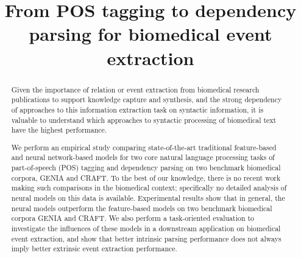 \documentclass[twocolumn,hyperref]{bmcart}\pdfoutput=1
\begin{document}
\begin{frontmatter}

\begin{fmbox}



\title{From POS tagging to dependency parsing for biomedical event extraction}



\author[
noteref={n1}, 
]{ }
\author[
noteref={n2}, 
]{ }





\begin{artnotes}
   \end{artnotes}





\begin{abstractbox}

\begin{abstract} 


 Given the importance of relation or event extraction from biomedical research publications to support knowledge capture and synthesis, and the strong dependency of approaches to this information extraction task on syntactic information, it is valuable to understand which approaches to syntactic processing of biomedical text have the highest performance.  

 We perform an empirical study  comparing state-of-the-art traditional feature-based and neural network-based models for two core natural language processing tasks of part-of-speech (POS) tagging and dependency parsing on two benchmark biomedical corpora, GENIA 
and CRAFT. To the best of our knowledge, there  is  no  recent  work  making such comparisons in the biomedical context; specifically no detailed analysis of neural models on this data is available. Experimental results show that in general, the neural models outperform the feature-based models on two benchmark biomedical corpora GENIA and CRAFT. We also perform a task-oriented evaluation to investigate the influences of these models  in a downstream application on biomedical event extraction, and show that better intrinsic parsing performance does not always imply better extrinsic event extraction performance. 


\end{abstract}
\end{abstractbox}
\end{fmbox}
\end{frontmatter}
\end{document}
